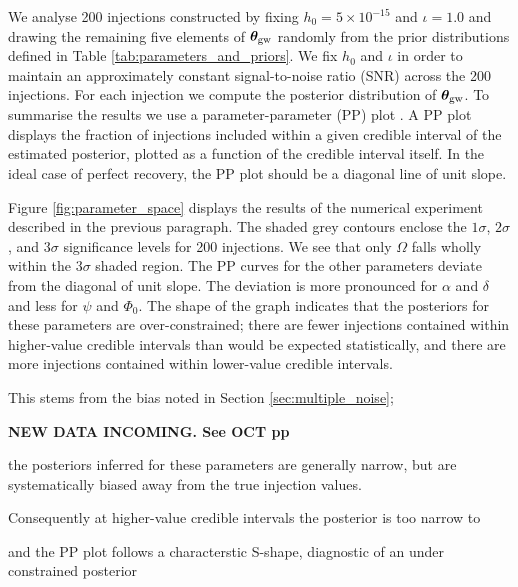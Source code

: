 \documentclass[fleqn,usenatbib,useAMS]{mnras}
\begin{document}
We analyse 200 injections constructed by fixing $h_0 = 5 \times 10^{-15}$ and $\iota =1.0$ and drawing the remaining five elements of $\boldsymbol{\theta}_{\rm gw}$ randomly from the prior distributions defined in Table \ref{tab:parameters_and_priors}. We fix $h_0$ and $\iota$ in order to maintain an approximately constant signal-to-noise ratio (SNR) across the 200 injections. For each injection we compute the posterior distribution of ${\boldsymbol{\theta}}_{\rm gw}$. To summarise the results we use a parameter-parameter (PP) plot \citep{doi:10.1198/106186006X136976}. A PP plot displays the fraction of injections included within a given credible interval of the estimated posterior, plotted as a function of the credible interval itself. In the ideal case of perfect recovery, the PP plot should be a diagonal line of unit slope. \newline 

 Figure \ref{fig:parameter_space} displays the results of the numerical experiment described in the previous paragraph. The shaded grey contours enclose the $1\sigma$, $2\sigma$, and $3\sigma$ significance levels for 200 injections. We see that only $\Omega$ falls wholly within the $3\sigma$ shaded region. The PP curves for the other parameters deviate from the diagonal of unit slope. The deviation is more pronounced for $\alpha$ and $\delta$ and less for $\psi$ and $\Phi_0$. The shape of the graph indicates that the posteriors for these parameters are over-constrained; there are fewer injections contained within higher-value credible intervals than would be expected statistically, and there are more injections contained within lower-value credible intervals. 
 
 
  
 This stems from the bias noted in Section \ref{sec:multiple_noise}; 
 
 
 
 
\textbf{ NEW DATA INCOMING. See OCT pp}

 the posteriors inferred for these parameters are generally narrow, but are systematically biased away from the true injection values. 
 
 
 
 Consequently at higher-value credible intervals the posterior is too narrow to 
 
 
 
 
 
 
 
 
 and the PP plot follows a characterstic S-shape, diagnostic of an under constrained posterior  
 
\end{document}

